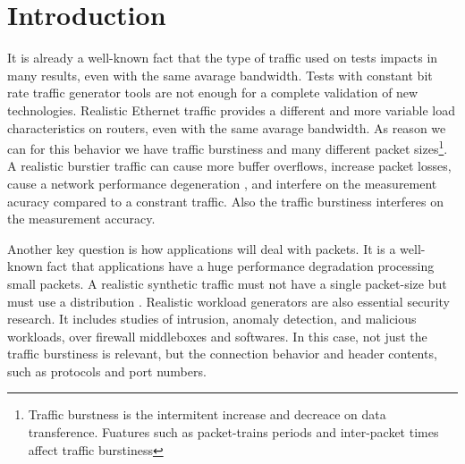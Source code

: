 \section{Introduction}\label{sec:introduction}


It is already a well-known fact that the type of traffic used on tests impacts in many results, even with the same avarage bandwidth. Tests with constant bit rate traffic generator tools are not enough for a complete validation of new technologies. Realistic Ethernet traffic provides a different and more variable load characteristics on routers\cite{harpoon-validation}, even with the same avarage bandwidth. As reason we can for this behavior we have traffic burstiness and many different packet sizes\footnote{Traffic burstness is the intermitent increase and decreace on data transference. Fuatures such as packet-trains periods and inter-packet times affect traffic burstiness}.
A realistic burstier traffic can cause more buffer overflows, increase packet losses, cause a network performance degeneration \cite{burstiness-queue-lenght} \cite{modelling-of-self-similar} \cite{empirical-interarrival-study}, and interfere on the measurement acuracy \cite{legotg-paper} \cite{background-traffic-matter} compared to a constrant traffic. Also the traffic burstiness interferes on the  measurement accuracy. 

Another key question is how applications will deal with packets. It is a well-known fact that applications have a huge performance degradation processing small packets\cite{comparative-trafficgen-tools}. A realistic synthetic traffic must not have a single packet-size but must use a distribution \cite{packet-distribution-model}.  Realistic workload generators are also essential security research\cite{ditg-paper}. It includes studies of intrusion, anomaly detection, and malicious workloads\cite{ditg-paper}, over firewall middleboxes and softwares. In this case, not just the traffic burstiness is relevant, but the connection behavior and header contents, such as protocols and port numbers.


